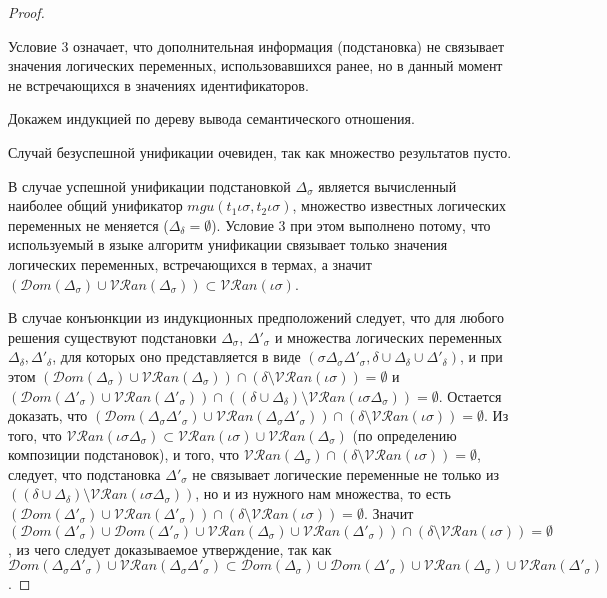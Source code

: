     \begin{proof}$ $\par\nobreak\ignorespaces
      Условие 3 означает, что дополнительная информация (подстановка) не связывает значения логических переменных, использовавшихся ранее, но в данный момент не встречающихся в значениях идентификаторов.
      
      Докажем индукцией по дереву вывода семантического отношения.
      
      Случай безуспешной унификации очевиден, так как множество результатов пусто.
      
      В случае успешной унификации подстановкой $\Delta_{\sigma}$ является вычисленный наиболее общий унификатор $mgu(t_1 \iota \sigma, t_2 \iota \sigma)$, множество известных логических переменных не меняется ($\Delta_{\delta} = \emptyset$). Условие 3 при этом выполнено потому, что используемый в языке алгоритм унификации связывает только значения логических переменных, встречающихся в термах, а значит $(\mathcal{D}om(\Delta_{\sigma}) \cup \mathcal{VR}an(\Delta_{\sigma})) \subset \mathcal{VR}an(\iota \sigma)$.
      
      В случае конъюнкции из индукционных предположений следует, что для любого решения существуют подстановки $\Delta_{\sigma}$, $\Delta'_{\sigma}$ и множества логических переменных $\Delta_{\delta}, \Delta'_{\delta}$, для которых оно представляется в виде $(\sigma \Delta_{\sigma} \Delta'_{\sigma}, \delta \cup \Delta_{\delta} \cup \Delta'_{\delta})$, и при этом $(\mathcal{D}om(\Delta_{\sigma}) \cup \mathcal{VR}an(\Delta_{\sigma})) \cap (\delta \setminus \mathcal{VR}an(\iota \sigma)) = \emptyset$ и $(\mathcal{D}om(\Delta'_{\sigma}) \cup \mathcal{VR}an(\Delta'_{\sigma})) \cap ((\delta \cup \Delta_{\delta}) \setminus \mathcal{VR}an(\iota \sigma \Delta_{\sigma})) = \emptyset$. Остается доказать, что $(\mathcal{D}om(\Delta_{\sigma} \Delta'_{\sigma}) \cup \mathcal{VR}an(\Delta_{\sigma} \Delta'_{\sigma})) \cap (\delta \setminus \mathcal{VR}an(\iota \sigma)) = \emptyset$. Из того, что $\mathcal{VR}an(\iota \sigma \Delta_{\sigma}) \subset \mathcal{VR}an(\iota \sigma) \cup \mathcal{VR}an(\Delta_{\sigma})$ (по определению композиции подстановок), и того, что $\mathcal{VR}an(\Delta_{\sigma}) \cap (\delta \setminus \mathcal{VR}an(\iota \sigma)) = \emptyset$, следует, что подстановка $\Delta'_{\sigma}$ не связывает логические переменные не только из $((\delta \cup \Delta_{\delta}) \setminus \mathcal{VR}an(\iota \sigma \Delta_{\sigma}))$, но и из нужного нам множества, то есть $(\mathcal{D}om(\Delta'_{\sigma}) \cup \mathcal{VR}an(\Delta'_{\sigma})) \cap (\delta \setminus \mathcal{VR}an(\iota \sigma)) = \emptyset$. Значит $(\mathcal{D}om(\Delta'_{\sigma}) \cup \mathcal{D}om(\Delta'_{\sigma}) \cup \mathcal{VR}an(\Delta_{\sigma}) \cup \mathcal{VR}an(\Delta'_{\sigma})) \cap (\delta \setminus \mathcal{VR}an(\iota \sigma)) = \emptyset$, из чего следует доказываемое утверждение, так как $\mathcal{D}om(\Delta_{\sigma} \Delta'_{\sigma}) \cup \mathcal{VR}an(\Delta_{\sigma} \Delta'_{\sigma}) \subset \mathcal{D}om(\Delta_{\sigma}) \cup \mathcal{D}om(\Delta'_{\sigma}) \cup \mathcal{VR}an(\Delta_{\sigma}) \cup \mathcal{VR}an(\Delta'_{\sigma})$.
      

\end{proof}
